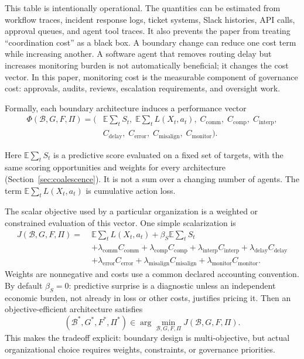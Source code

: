 \documentclass[11pt]{article}
\newcommand{\E}{\mathbb{E}}
\newcommand{\calB}{\mathcal{B}}
\begin{document}
This table is intentionally operational. The quantities can be estimated from
workflow traces, incident response logs, ticket systems, Slack histories, API
calls, approval queues, and agent tool traces. It also prevents the paper from
treating ``coordination cost'' as a black box. A boundary change can reduce one
cost term while increasing another. A software agent that removes routing delay
but increases monitoring burden is not automatically beneficial; it changes the
cost vector. In this paper, monitoring cost is the measurable component of
governance cost: approvals, audits, reviews, escalation requirements, and
oversight work.

Formally, each boundary architecture induces a performance vector
\[
\begin{aligned}
\Phi(\calB,G,F,\Pi)=(&
\E\sum_t S_t,\;
\E\sum_t L(X_t,a_t),\;
C_{\mathrm{comm}},\;
C_{\mathrm{comp}},\;
C_{\mathrm{interp}},\\
&C_{\mathrm{delay}},\;
C_{\mathrm{error}},\;
C_{\mathrm{misalign}},\;
C_{\mathrm{monitor}}).
\end{aligned}
\]

Here $\E\sum_t S_t$ is a predictive score evaluated on a fixed set of targets,
with the same scoring opportunities and weights for every architecture
(Section~\ref{sec:coalescence}). It is not a sum over a changing number of
agents. The term $\E\sum_t L(X_t,a_t)$ is cumulative action loss.

The scalar objective used by a particular organization is a weighted or
constrained evaluation of this vector. One simple scalarization is
\[
\begin{aligned}
J(\calB,G,F,\Pi)
=\;&\E\sum_t L(X_t,a_t)
+\beta_S \E\sum_t S_t \\
&+\lambda_{\mathrm{comm}}C_{\mathrm{comm}}
+\lambda_{\mathrm{comp}}C_{\mathrm{comp}}
+\lambda_{\mathrm{interp}}C_{\mathrm{interp}}
+\lambda_{\mathrm{delay}}C_{\mathrm{delay}} \\
&+\lambda_{\mathrm{error}}C_{\mathrm{error}}
+\lambda_{\mathrm{misalign}}C_{\mathrm{misalign}}
+\lambda_{\mathrm{monitor}}C_{\mathrm{monitor}}.
\end{aligned}
\]
Weights are nonnegative and costs use a common declared accounting
convention. By default $\beta_S=0$: predictive surprise is a diagnostic unless
an independent economic burden, not already in loss or other costs, justifies
pricing it. Then an objective-efficient architecture satisfies
\[
(\calB^*,G^*,F^*,\Pi^*)\in \arg\min_{\calB,G,F,\Pi}J(\calB,G,F,\Pi).
\]
This makes the tradeoff explicit: boundary design is multi-objective, but
actual organizational choice requires weights, constraints, or governance
priorities.
\end{document}
